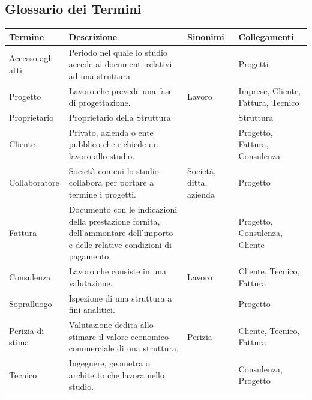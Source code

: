 \documentclass{elegantbook}
\begin{document}
	\subsection{Glossario dei Termini}
	\label{sec:Glossario}
	\begin{center}
		\small
		\begin{longtable}{|l|p{7cm}|l|p{3cm}|}
			\hline
			\textbf{Termine} & \textbf{Descrizione} & \textbf{Sinonimi} & \textbf{Collegamenti}\\
			\hline
			
			Accesso agli atti & Periodo nel quale lo studio accede ai documenti relativi ad una struttura & & Progetti\\
			\hline
			
			Progetto & Lavoro che prevede una fase di progettazione. &Lavoro & Imprese, Cliente, Fattura, Tecnico\\
			\hline
			
			Proprietario & Proprietario della Struttura & & Struttura\\
			\hline
			
			Cliente & Privato, azienda o ente pubblico che richiede un lavoro allo studio. & & Progetto, Fattura, Consulenza\\
			\hline
			
			Collaboratore & Società con cui lo studio collabora per portare a termine i progetti. & Società, ditta, azienda & Progetto\\
			\hline
			
			Fattura & Documento con le indicazioni della prestazione fornita, dell'ammontare dell'importo e delle
                        relative condizioni di pagamento. & & Progetto, Consulenza, Cliente\\
			\hline

			Consulenza & Lavoro che consiste in una valutazione. &Lavoro & Cliente, Tecnico, Fattura\\
			\hline
			
			Sopralluogo & Ispezione di una struttura a fini analitici. & & Progetto\\
			\hline
			
			Perizia di stima & Valutazione dedita allo stimare il valore economico-commerciale di una struttura.& Perizia & Cliente, Tecnico, Fattura\\
			\hline
			
			Tecnico & Ingegnere, geometra o architetto che lavora nello studio. & & Consulenza, Progetto\\
			\hline
			

\end{longtable}
\end{center}
\end{document}
